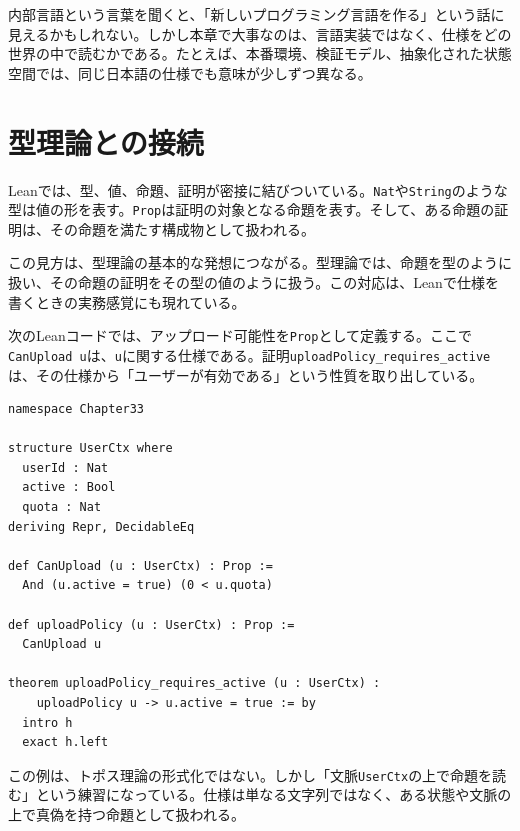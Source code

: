 \begin{warningbox}
内部言語という言葉を聞くと、「新しいプログラミング言語を作る」という話に見えるかもしれない。しかし本章で大事なのは、言語実装ではなく、仕様をどの世界の中で読むかである。たとえば、本番環境、検証モデル、抽象化された状態空間では、同じ日本語の仕様でも意味が少しずつ異なる。
\end{warningbox}

\section{型理論との接続}

Leanでは、型、値、命題、証明が密接に結びついている。\texttt{Nat}や\texttt{String}のような型は値の形を表す。\texttt{Prop}は証明の対象となる命題を表す。そして、ある命題の証明は、その命題を満たす構成物として扱われる。

この見方は、型理論の基本的な発想につながる。型理論では、命題を型のように扱い、その命題の証明をその型の値のように扱う。この対応は、Leanで仕様を書くときの実務感覚にも現れている。

\begin{leanbox}
次のLeanコードでは、アップロード可能性を\texttt{Prop}として定義する。ここで\texttt{CanUpload u}は、\texttt{u}に関する仕様である。証明\texttt{uploadPolicy\_requires\_active}は、その仕様から「ユーザーが有効である」という性質を取り出している。
\end{leanbox}

\begin{listing}[htbp]
\begin{verbatim}
namespace Chapter33

structure UserCtx where
  userId : Nat
  active : Bool
  quota : Nat
deriving Repr, DecidableEq

def CanUpload (u : UserCtx) : Prop :=
  And (u.active = true) (0 < u.quota)

def uploadPolicy (u : UserCtx) : Prop :=
  CanUpload u

theorem uploadPolicy_requires_active (u : UserCtx) :
    uploadPolicy u -> u.active = true := by
  intro h
  exact h.left
\end{verbatim}
\caption{文脈に依存する仕様を命題として書く}
\label{lst:ch33_user_policy}
\end{listing}

この例は、トポス理論の形式化ではない。しかし「文脈\texttt{UserCtx}の上で命題を読む」という練習になっている。仕様は単なる文字列ではなく、ある状態や文脈の上で真偽を持つ命題として扱われる。

